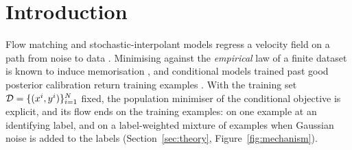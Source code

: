 \documentclass{article} %
\theoremstyle{plain}
\theoremstyle{definition}
\theoremstyle{remark}
\begin{document}
\section{Introduction}
\label{sec:intro}

Flow matching and stochastic-interpolant models
\citep{lipman2023flow,albergo2023building,liu2023rectified,albergo2023stochastic}
regress a velocity field on a path from noise to data \citep{tong2024improving}. Minimising
against the \emph{empirical} law of a finite dataset is known to induce memorisation
\citep{carlini2023extracting,somepalli2023diffusion,sesmat2026leaks}, and conditional models
trained past good posterior calibration return training examples \citep{physicscfm2026}. With
the training set $\mathcal{D}=\{(x^i,y^i)\}_{i=1}^N$ fixed, the population minimiser of the conditional
objective is explicit, and its flow ends on the training examples: on one example at an
identifying label, and on a label-weighted mixture of examples when Gaussian noise is added to
the labels (Section~\ref{sec:theory}, Figure~\ref{fig:mechanism}).
\end{document}

